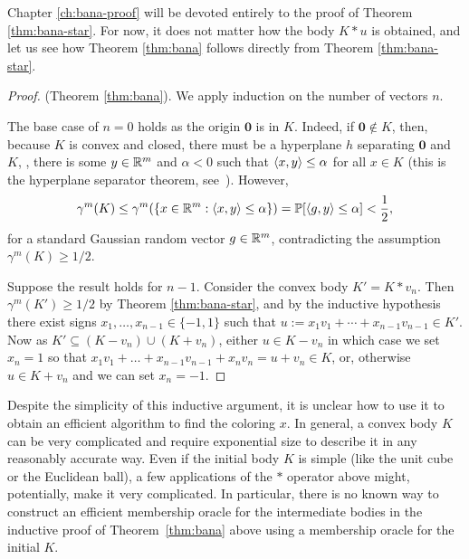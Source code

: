 Chapter \ref{ch:bana-proof} will be devoted entirely to the proof of Theorem \ref{thm:bana-star}.
For now, it does not matter how the body $K*u$ is obtained, and let us see how Theorem \ref{thm:bana} follows directly from Theorem \ref{thm:bana-star}. 
\begin{proof}(Theorem \ref{thm:bana}).
We apply induction on the number of vectors $n$.

The base case of $n=0$ holds as the origin $\mathbf{0}$ is
in $K$. Indeed, if $\mathbf{0} \notin K$, then, because $K$ is convex
and closed,
there must be a hyperplane $h$ separating $\mathbf{0}$ and $K$, \ie,
there is some $y \in \mathbb{R}^m$ and $\alpha < 0$ such that $\langle x,y\rangle \le  \alpha$ for all $x \in
K$ (this is the hyperplane separator theorem, see~\cite[Corollary~11.4.2]{Rockafellar}). However,
\[
\gamma^m(K) \le \gamma^m(\{x\in \mathbb{R}^m: \langle x,y\rangle \le \alpha\}) =
\mathbb{P}[\langle g,y\rangle \le \alpha] < \frac12,
\]
for a standard Gaussian random vector $g \in \mathbb{R}^m$, contradicting
the assumption $\gamma^m(K) \geq 1/2$.

Suppose the result holds for $n-1$.
Consider the convex body $K'=K*v_n$. Then $\gamma^m(K') \geq 1/2$ by Theorem \ref{thm:bana-star}, and  
by the inductive hypothesis %
there exist signs $x_1,\ldots,x_{n-1} \in \{-1,1\}$ such that 
$u := x_1 v_1 + \cdots + x_{n-1} v_{n-1} \in K'$. Now as $K' \subseteq (K-v_n) \cup (K+ v_n)$, 
either $u \in K-v_n$ in which case we set $x_n=1$ so that 
$x_1v_1+ \ldots + x_{n-1}v_{n-1} + x_n v_n =  u+ v_n \in K$, or, otherwise
$u \in K+v_n$ and we can set $x_{n}=-1$.
\end{proof}
Despite the simplicity of this inductive argument, it is unclear
how to use it to obtain an efficient algorithm to find the
coloring $x$. In general, a convex body $K$ can be very complicated
and require exponential size to describe it in any reasonably accurate
way. Even if the initial body $K$ is simple (like the unit
cube or the Euclidean ball), a few applications of the $*$ operator
above might, potentially, make it very complicated. In particular,
there is no known way to construct an efficient membership oracle for
the intermediate bodies in the inductive proof of
Theorem~\ref{thm:bana} above using a membership oracle for the initial $K$.

